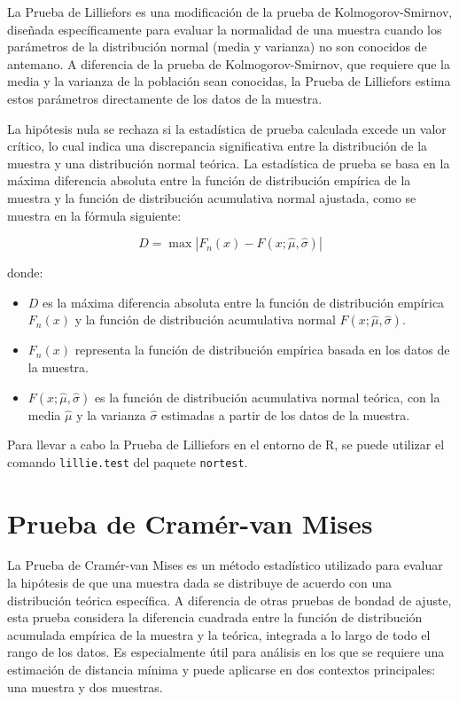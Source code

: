 \documentclass{article}
\begin{document}
La Prueba de Lilliefors es una modificación de la prueba de Kolmogorov-Smirnov, diseñada específicamente para evaluar la normalidad de una muestra cuando los parámetros de la distribución normal (media y varianza) no son conocidos de antemano. A diferencia de la prueba de Kolmogorov-Smirnov, que requiere que la media y la varianza de la población sean conocidas, la Prueba de Lilliefors estima estos parámetros directamente de los datos de la muestra.

La hipótesis nula se rechaza si la estadística de prueba calculada excede un valor crítico, lo cual indica una discrepancia significativa entre la distribución de la muestra y una distribución normal teórica. La estadística de prueba se basa en la máxima diferencia absoluta entre la función de distribución empírica de la muestra y la función de distribución acumulativa normal ajustada, como se muestra en la fórmula siguiente:

\[
    D = \max | F_n(x) - F(x; \hat{\mu}, \hat{\sigma}) |
\]

donde:
\begin{itemize}
    \item \(D\) es la máxima diferencia absoluta entre la función de distribución empírica \(F_n(x)\) y la función de distribución acumulativa normal \(F(x; \hat{\mu}, \hat{\sigma})\).
    \item \(F_n(x)\) representa la función de distribución empírica basada en los datos de la muestra.
    \item \(F(x; \hat{\mu}, \hat{\sigma})\) es la función de distribución acumulativa normal teórica, con la media \(\hat{\mu}\) y la varianza \(\hat{\sigma}\) estimadas a partir de los datos de la muestra.
\end{itemize}

Para llevar a cabo la Prueba de Lilliefors en el entorno de R, se puede utilizar el comando \texttt{lillie.test} del paquete \texttt{nortest}.


\section{Prueba de Cramér-van Mises}

La Prueba de Cramér-van Mises es un método estadístico utilizado para evaluar la hipótesis de que una muestra dada se distribuye de acuerdo con una distribución teórica específica. A diferencia de otras pruebas de bondad de ajuste, esta prueba considera la diferencia cuadrada entre la función de distribución acumulada empírica de la muestra y la teórica, integrada a lo largo de todo el rango de los datos. Es especialmente útil para análisis en los que se requiere una estimación de distancia mínima y puede aplicarse en dos contextos principales: una muestra y dos muestras.
\end{document}
